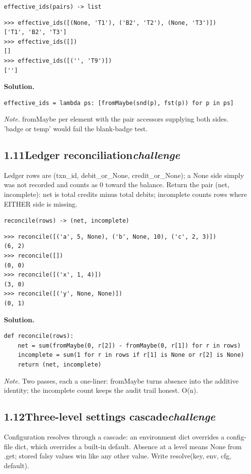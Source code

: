 \documentclass[10pt,letterpaper]{book}
\begin{document}
\noindent\texttt{effective\_ids(pairs) -> list}
\begin{lstlisting}[style=ex]
>>> effective_ids([(None, 'T1'), ('B2', 'T2'), (None, 'T3')])
['T1', 'B2', 'T3']
>>> effective_ids([])
[]
>>> effective_ids([('', 'T9')])
['']
\end{lstlisting}
\noindent\textbf{Solution.}
\begin{lstlisting}[style=code]
effective_ids = lambda ps: [fromMaybe(snd(p), fst(p)) for p in ps]
\end{lstlisting}
\noindent\textit{Note.} fromMaybe per element with the pair accessors supplying both sides. 'badge or temp' would fail the blank-badge test.

\subsection*{1.11\quad Ledger reconciliation\hfill\textnormal{\textit{challenge}}}
Ledger rows are (txn\_id, debit\_or\_None, credit\_or\_None); a None side simply was not recorded and counts as 0 toward the balance. Return the pair (net, incomplete): net is total credits minus total debits; incomplete counts rows where EITHER side is missing.

\noindent\texttt{reconcile(rows) -> (net, incomplete)}
\begin{lstlisting}[style=ex]
>>> reconcile([('a', 5, None), ('b', None, 10), ('c', 2, 3)])
(6, 2)
>>> reconcile([])
(0, 0)
>>> reconcile([('x', 1, 4)])
(3, 0)
>>> reconcile([('y', None, None)])
(0, 1)
\end{lstlisting}
\noindent\textbf{Solution.}
\begin{lstlisting}[style=code]
def reconcile(rows):
    net = sum(fromMaybe(0, r[2]) - fromMaybe(0, r[1]) for r in rows)
    incomplete = sum(1 for r in rows if r[1] is None or r[2] is None)
    return (net, incomplete)
\end{lstlisting}
\noindent\textit{Note.} Two passes, each a one-liner: fromMaybe turns absence into the additive identity; the incomplete count keeps the audit trail honest. O(n).

\subsection*{1.12\quad Three-level settings cascade\hfill\textnormal{\textit{challenge}}}
Configuration resolves through a cascade: an environment dict overrides a config-file dict, which overrides a built-in default. Absence at a level means None from .get; stored falsy values win like any other value. Write resolve(key, env, cfg, default).
\end{document}
